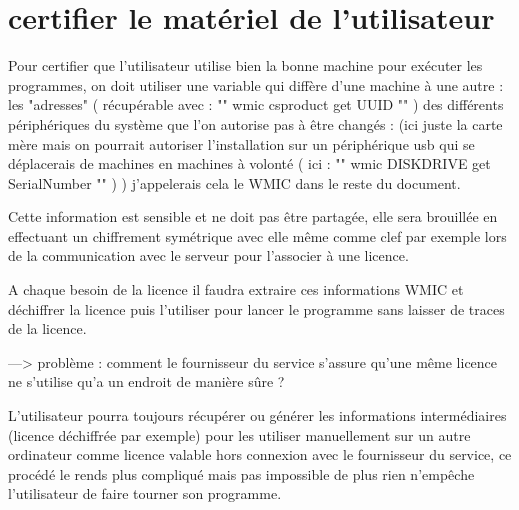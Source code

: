 \documentclass{article}
\begin{document}
\section{certifier le matériel de l'utilisateur}

Pour certifier que l'utilisateur utilise bien la bonne machine pour exécuter les programmes, on doit utiliser une variable qui diffère d'une machine à une autre : les "adresses" ( récupérable avec : "" wmic csproduct get UUID "" ) des différents périphériques du système que l'on autorise pas à être changés : (ici juste la carte mère mais on pourrait autoriser l'installation sur un périphérique usb qui se déplacerais de machines en machines à volonté ( ici : "" wmic DISKDRIVE get SerialNumber "" )  ) j'appelerais cela le WMIC dans le reste du document.

Cette information est sensible et ne doit pas être partagée, elle sera brouillée en effectuant un chiffrement symétrique avec elle même comme clef par exemple lors de la communication avec le serveur pour l'associer à une licence.

A chaque besoin de la licence il faudra extraire ces informations WMIC et déchiffrer la licence puis l'utiliser pour lancer le programme sans laisser de traces de la licence.

---> problème : comment le fournisseur du service s'assure qu'une même licence ne s'utilise qu'a un endroit de manière sûre ?

L'utilisateur pourra toujours récupérer ou générer les informations intermédiaires (licence déchiffrée par exemple) pour les utiliser manuellement sur un autre ordinateur comme licence valable hors connexion avec le fournisseur du service, ce procédé le rends plus compliqué mais pas impossible de plus rien n'empêche l'utilisateur de faire tourner son programme.
\end{document}
